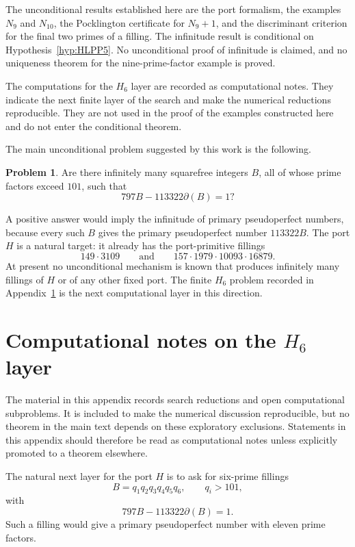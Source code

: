\documentclass[11pt]{amsart}
\theoremstyle{plain}
\theoremstyle{definition}
\newtheorem{problem}[theorem]{Problem}
\theoremstyle{remark}
\newcommand{\dd}{\partial}
\begin{document}
The unconditional results established here are the port formalism, the examples $N_9$ and $N_{10}$, the Pocklington certificate for $N_9+1$, and the discriminant criterion for the final two primes of a filling.  The infinitude result is conditional on Hypothesis~\ref{hyp:HLPP5}.  No unconditional proof of infinitude is claimed, and no uniqueness theorem for the nine-prime-factor example is proved.

The computations for the $H_6$ layer are recorded as computational notes.  They indicate the next finite layer of the search and make the numerical reductions reproducible.  They are not used in the proof of the examples constructed here and do not enter the conditional theorem.

The main unconditional problem suggested by this work is the following.

\begin{problem}\label{prob:H-infinite}
Are there infinitely many squarefree integers $B$, all of whose prime factors exceed $101$, such that
\[
        797B-113322\dd(B)=1?
\]
\end{problem}

A positive answer would imply the infinitude of primary pseudoperfect numbers, because every such $B$ gives the primary pseudoperfect number $113322B$.  The port $H$ is a natural target: it already has the port-primitive fillings
\[
        149\cdot3109
        \qquad\text{and}\qquad
        157\cdot1979\cdot10093\cdot16879.
\]
At present no unconditional mechanism is known that produces infinitely many fillings of $H$ or of any other fixed port.  The finite $H_6$ problem recorded in Appendix~\ref{app:computational-notes} is the next computational layer in this direction.

\appendix

\section{Computational notes on the \texorpdfstring{$H_6$}{H6} layer}\label{app:computational-notes}


The material in this appendix records search reductions and open computational subproblems.  It is included to make the numerical discussion reproducible, but no theorem in the main text depends on these exploratory exclusions.  Statements in this appendix should therefore be read as computational notes unless explicitly promoted to a theorem elsewhere.


The natural next layer for the port $H$ is to ask for six-prime fillings
\begin{equation}\label{eq:H6}
        B=q_1q_2q_3q_4q_5q_6,
        \qquad
        q_i>101,
\end{equation}
with
\[
        797B-113322\dd(B)=1.
\]
Such a filling would give a primary pseudoperfect number with eleven prime factors.
\end{document}
